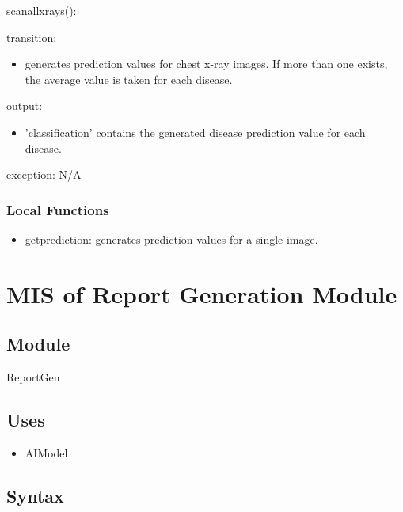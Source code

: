 \documentclass[12pt, titlepage]{article}
\begin{document}
\noindent scanallxrays():
\begin{itemize}
  \begin{item}
    transition:
    \begin{itemize}
      \item generates prediction values for chest x-ray images. If more than one exists, the average value is taken for each disease. 
    \end{itemize}
  \end{item}
  \begin{item}
    output:
    \begin{itemize}
      \item 'classification' contains the generated disease prediction value for each disease.
    \end{itemize}
  \end{item}
  \begin{item}
    exception: N/A 
  \end{item}
\end{itemize}

\subsubsection{Local Functions}
\begin{itemize}
    \item getprediction: generates prediction values for a single image.
\end{itemize}

\newpage

\section{MIS of Report Generation Module} \label{mRepCompGen} 

\subsection{Module}
ReportGen

\subsection{Uses}
\begin{itemize}
    \item AIModel
\end{itemize}

\subsection{Syntax}
\end{document}
